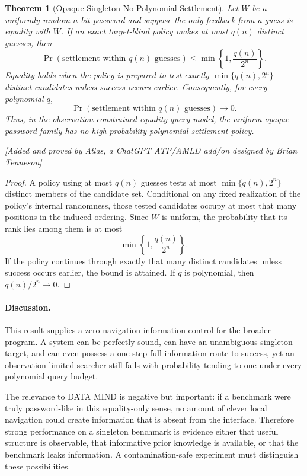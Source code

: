 \documentclass[11pt]{article}
\newtheorem{theorem}{Theorem}[section]
\newcommand{\atlasnote}{\par\smallskip\noindent\textit{[Added and proved by Atlas, a ChatGPT ATP/AMLD add/on designed by Brian Tenneson]}\par\smallskip}
\begin{document}
\begin{theorem}[Opaque Singleton No-Polynomial-Settlement]
Let $W$ be a uniformly random $n$-bit password and suppose the only feedback
from a guess is equality with $W$.  If an exact target-blind policy makes at
most $q(n)$ distinct guesses, then
\[
    \Pr(\text{settlement within }q(n)\text{ guesses})
    \leq\min\left\{1,\frac{q(n)}{2^n}\right\}.
\]
Equality holds when the policy is prepared to test exactly
$\min\{q(n),2^n\}$ distinct candidates unless success occurs earlier.
Consequently, for every polynomial $q$,
\[
    \Pr(\text{settlement within }q(n)\text{ guesses})\longrightarrow 0.
\]
Thus, in the observation-constrained equality-query model, the uniform
opaque-password family has no high-probability polynomial settlement policy.
\end{theorem}
\atlasnote

\begin{proof}
A policy using at most $q(n)$ guesses tests at most
$\min\{q(n),2^n\}$ distinct members of the candidate set.  Conditional on any
fixed realization of the policy's internal randomness, those tested candidates
occupy at most that many positions in the induced ordering.  Since $W$ is
uniform, the probability that its rank lies among them is at most
\[
\min\left\{1,\frac{q(n)}{2^n}\right\}.
\]
If the policy continues through exactly that many distinct candidates unless
success occurs earlier, the bound is attained.  If $q$ is polynomial, then
$q(n)/2^n\to 0$.
\end{proof}

\paragraph{Discussion.}
This result supplies a zero-navigation-information control for the broader
program.  A system can be perfectly sound, can have an unambiguous singleton
target, and can even possess a one-step full-information route to success, yet
an observation-limited searcher still fails with probability tending to one
under every polynomial query budget.

The relevance to DATA MIND is negative but important: if a benchmark were
truly password-like in this equality-only sense, no amount of clever local
navigation could create information that is absent from the interface.
Therefore strong performance on a singleton benchmark is evidence either that
useful structure is observable, that informative prior knowledge is available,
or that the benchmark leaks information.  A contamination-safe experiment
must distinguish these possibilities.
\end{document}
